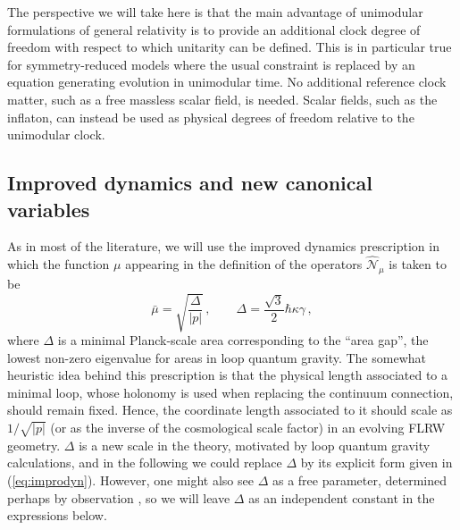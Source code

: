 \documentclass[aps,prd,11pt,showkeys,nofootinbib]{revtex4-2}
\begin{document}
The perspective we will take here is that the main advantage of unimodular formulations of general relativity is to provide an additional clock degree of freedom with respect to which unitarity can be defined. This is in particular true for symmetry-reduced models where the usual constraint is replaced by an equation generating evolution in unimodular time. No additional reference clock matter, such as a free massless scalar field, is needed. Scalar fields, such as the inflaton, can instead be used as physical degrees of freedom relative to the unimodular clock. 

\subsection{Improved dynamics and new canonical variables}

As in most of the literature, we will use the improved dynamics prescription \cite{improve} in which the function $\mu$ appearing in the definition of the operators $\hat{\mathcal{N}}_\mu$ is taken to be
\begin{equation}
\bar\mu = \sqrt{\frac{\Delta}{|p|}}\,, \qquad \Delta = \frac{\sqrt{3}}{2}\hbar\kappa\gamma\,,
\label{eq:improdyn}
\end{equation}
where $\Delta$ is a minimal Planck-scale area corresponding to the ``area gap'', the lowest non-zero eigenvalue for areas in loop quantum gravity. The somewhat heuristic idea behind this prescription is that the physical length associated to a minimal loop, whose holonomy is used when replacing the continuum connection, should remain fixed. Hence, the coordinate length associated to it should scale as $1/\sqrt{|p|}$ (or as the inverse of the cosmological scale factor) in an evolving FLRW geometry. $\Delta$ is a new scale in the theory, motivated by loop quantum gravity calculations, and in the following we could replace $\Delta$ by its explicit form given in (\ref{eq:improdyn}). However, one might also see $\Delta$ as a free parameter, determined perhaps by observation \cite{Ashtekar:2021kfp}, so we will leave $\Delta$ as an independent constant in the expressions below.
\end{document}
